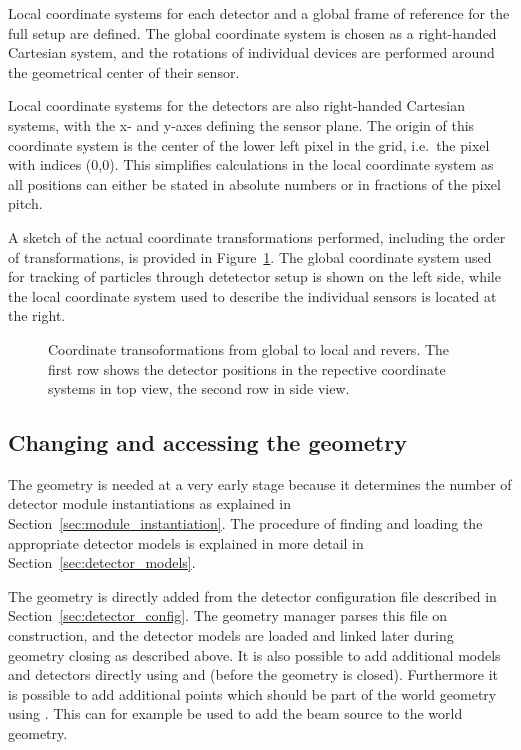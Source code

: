 Local coordinate systems for each detector and a global frame of reference for the full setup are defined.
The global coordinate system is chosen as a right-handed Cartesian system, and the rotations of individual devices are performed around the geometrical center of their sensor.

Local coordinate systems for the detectors are also right-handed Cartesian systems, with the x- and y-axes defining the sensor plane.
The origin of this coordinate system is the center of the lower left pixel in the grid, i.e.\ the pixel with indices (0,0).
This simplifies calculations in the local coordinate system as all positions can either be stated in absolute numbers or in fractions of the pixel pitch.

A sketch of the actual coordinate transformations performed, including the order of transformations, is provided in Figure~\ref{fig:transformations}. The global coordinate system used for tracking of particles through detetector setup is shown on the left side, while the local coordinate system used to describe the individual sensors is located at the right.

\begin{figure}[tbp]
  \center
  
  \caption{Coordinate transoformations from global to local and revers. The first row shows the detector positions in the repective coordinate systems in top view, the second row in side view.}
  \label{fig:transformations}
\end{figure}

\subsection{Changing and accessing the geometry}
The geometry is needed at a very early stage because it determines the number of detector module instantiations as explained in Section~\ref{sec:module_instantiation}.
The procedure of finding and loading the appropriate detector models is explained in more detail in Section~\ref{sec:detector_models}.

The geometry is directly added from the detector configuration file described in Section~\ref{sec:detector_config}.
The geometry manager parses this file on construction, and the detector models are loaded and linked later during geometry closing as described above.
It is also possible to add additional models and detectors directly using  and  (before the geometry is closed).
Furthermore it is possible to add additional points which should be part of the world geometry using .
This can for example be used to add the beam source to the world geometry.

